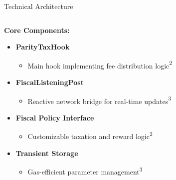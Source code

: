 \documentclass[aspectratio=169]{beamer}
\newcommand{\citecapponi}{\textcolor{paritygreen}{\textsuperscript{2}}}
\newcommand{\citema}{\textcolor{parityorange}{\textsuperscript{3}}}
\begin{document}
\begin{frame}{Technical Architecture}
    \begin{columns}
        \begin{column}{0.45\textwidth}  %
            \textbf{Core Components:}
            \begin{itemize}
                \item \textcolor{parityblue}{\textbf{ParityTaxHook}}
                \begin{itemize}
                    \item \footnotesize Main hook implementing fee distribution logic\citecapponi
                \end{itemize}
                
                \item \textcolor{parityblue}{\textbf{FiscalListeningPost}}
                \begin{itemize}
                    \item \footnotesize Reactive network bridge for real-time updates\citema
                \end{itemize}
                
                \item \textcolor{parityblue}{\textbf{Fiscal Policy Interface}}
                \begin{itemize}
                    \item \footnotesize Customizable taxation and reward logic\citecapponi
                \end{itemize}
                
                \item \textcolor{parityblue}{\textbf{Transient Storage}}
                \begin{itemize}
                    \item \footnotesize Gas-efficient parameter management\citema
                \end{itemize}
            \end{itemize}
            

\end{column}
\end{columns}
\end{frame}
\end{document}
